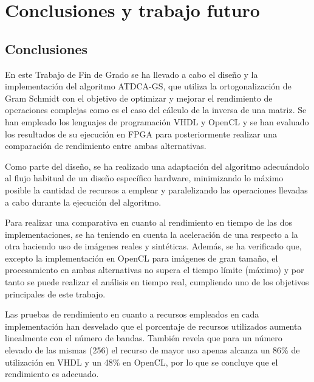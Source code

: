 \cleardoublepage
\mbox{}

\chapter{Conclusiones y trabajo futuro}
\label{ch:chapte6}

\section{Conclusiones}

En este Trabajo de Fin de Grado se ha llevado a cabo el diseño y la implementación del algoritmo ATDCA-GS, que utiliza la ortogonalización de Gram Schmidt con el objetivo de optimizar y mejorar el rendimiento de operaciones complejas como es el caso del cálculo de la inversa de una matriz. Se han empleado los lenguajes de programación VHDL y OpenCL y se han evaluado los resultados de su ejecución en FPGA para posteriormente realizar una comparación de rendimiento entre ambas alternativas.

Como parte del diseño, se ha realizado una adaptación del algoritmo adecuándolo al flujo habitual de un diseño específico hardware, minimizando lo máximo posible la cantidad de recursos a emplear y paralelizando las operaciones llevadas a cabo durante la ejecución del algoritmo.

Para realizar una comparativa en cuanto al rendimiento en tiempo de las dos implementaciones, se ha teniendo en cuenta la aceleración de una respecto a la otra haciendo uso de imágenes reales y sintéticas. Además, se ha verificado que, excepto la implementación en OpenCL para imágenes de gran tamaño, el procesamiento en ambas alternativas no supera el tiempo límite (máximo) y por tanto se puede realizar el análisis en tiempo real, cumpliendo uno de los objetivos principales de este trabajo.

Las pruebas de rendimiento en cuanto a recursos empleados en cada implementación han desvelado que el porcentaje de recursos utilizados aumenta linealmente con el número de bandas. También revela que para un número elevado de las mismas (256) el recurso de mayor uso apenas alcanza un 86\% de utilización en VHDL y un 48\% en OpenCL, por lo que se concluye que el rendimiento es adecuado.


